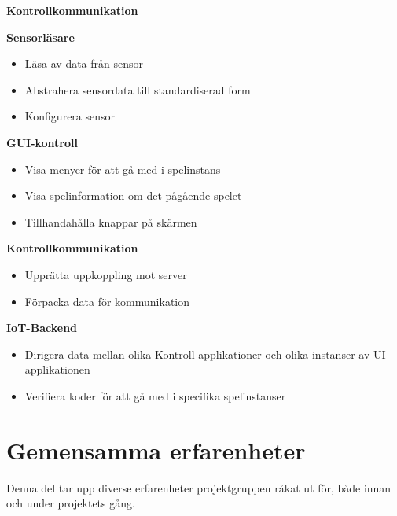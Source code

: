 \begin{labeling}{\small{\textbf{Kontrollkommunikation}}}
    \item [\small{\textbf{Sensorläsare}}]
        \begin{itemize}
            \item Läsa av data från sensor
            \item Abstrahera sensordata till standardiserad form
            \item Konfigurera sensor
            \newline
        \end{itemize}

    \item [\small{\textbf{GUI-kontroll}}]
        \begin{itemize}
            \item Visa menyer för att gå med i spelinstans
            \item Visa spelinformation om det pågående spelet
            \item Tillhandahålla knappar på skärmen
            \newline
        \end{itemize}

    \item [\small{\textbf{Kontrollkommunikation}}]
        \begin{itemize}
            \item Upprätta uppkoppling mot server
            \item Förpacka data för kommunikation
            \newline
        \end{itemize}

    \item [\small{\textbf{IoT-Backend}}]
        \begin{itemize}
            \item Dirigera data mellan olika Kontroll-applikationer och olika instanser av UI-applikationen
            \item Verifiera koder för att gå med i specifika spelinstanser
            \newline
        \end{itemize}
\end{labeling}


\section{Gemensamma erfarenheter}
Denna del tar upp diverse erfarenheter projektgruppen råkat ut för, både innan och under projektets gång.

